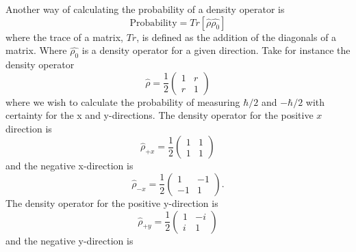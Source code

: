 \documentclass[twocolumn]{article}
\begin{document}
Another way of calculating the probability of a density operator is
\begin{equation}
\text{Probability}=Tr[\hat{\rho}\hat{\rho_0}]
\end{equation}
where the trace of a matrix, $Tr$, is defined as the addition of the diagonals of a matrix. Where $\hat{\rho_0}$ is a density operator for a given direction. Take for instance the density operator
\begin{equation}
\hat{\rho}=\frac{1}{2}
\begin{pmatrix}
1 & r \\
r & 1
\end{pmatrix}
\end{equation}
where we wish to calculate the probability of measuring $\hbar/2$ and $-\hbar/2$ with certainty for the x and y-directions. The density operator for the positive $x$ direction is
\begin{equation}
\hat{\rho}_{+x}=\frac{1}{2}
\begin{pmatrix}
1 & 1 \\
1 & 1
\end{pmatrix}
\end{equation}
and the negative x-direction is
\begin{equation}
\hat{\rho}_{-x}=\frac{1}{2}
\begin{pmatrix}
1 & -1 \\
-1 & 1
\end{pmatrix}.
\end{equation}
The density operator for the positive y-direction is
\begin{equation}
\hat{\rho}_{+y}=\frac{1}{2}
\begin{pmatrix}
1 & -i \\
i & 1
\end{pmatrix}
\end{equation}
and the negative y-direction is
\end{document}
